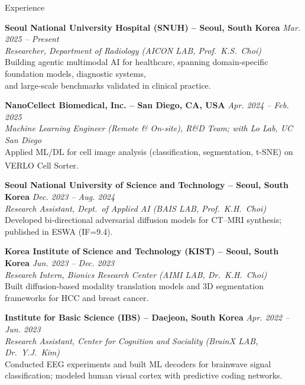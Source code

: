 \documentclass{resume}
\begin{document}
\begin{rSection}{Experience}

\bigskip
\textbf{Seoul National University Hospital (SNUH) -- Seoul, South Korea} \hfill \textit{Mar. 2025 -- Present} \\
\hspace*{0.5em} \textit{Researcher, Department of Radiology (AICON LAB, Prof.\ K.S.\ Choi)} \\
\hspace*{1em} Building agentic multimodal AI for healthcare, spanning domain-specific foundation models, diagnostic systems, \\
\hspace*{1em} and large-scale benchmarks validated in clinical practice.

\bigskip
\textbf{NanoCellect Biomedical, Inc. -- San Diego, CA, USA} \hfill \textit{Apr. 2024 -- Feb. 2025} \\
\hspace*{0.5em} \textit{Machine Learning Engineer (Remote \& On-site), R\&D Team; with Lo Lab, UC San Diego} \\
\hspace*{1em} Applied ML/DL for cell image analysis (classification, segmentation, t-SNE) on VERLO\textsuperscript{\texttrademark} Cell Sorter.

\bigskip
\textbf{Seoul National University of Science and Technology -- Seoul, South Korea} \hfill \textit{Dec. 2023 -- Aug. 2024} \\
\hspace*{0.5em} \textit{Research Assistant, Dept.\ of Applied AI (BAIS LAB, Prof.\ K.H.\ Choi)} \\
\hspace*{1em} Developed bi-directional adversarial diffusion models for CT--MRI synthesis; published in ESWA (IF=9.4).

\bigskip
\textbf{Korea Institute of Science and Technology (KIST) -- Seoul, South Korea} \hfill \textit{Jun. 2023 -- Dec. 2023} \\
\hspace*{0.5em} \textit{Research Intern, Bionics Research Center (AIMI LAB, Dr.\ K.H.\ Choi)} \\
\hspace*{1em} Built diffusion-based modality translation models and 3D segmentation frameworks for HCC and breast cancer.

\bigskip
\textbf{Institute for Basic Science (IBS) -- Daejeon, South Korea} \hfill \textit{Apr. 2022 -- Jun. 2023} \\
\hspace*{0.5em} \textit{Research Assistant, Center for Cognition and Sociality (BrainX LAB, Dr.\ Y.J.\ Kim)} \\
\hspace*{1em} Conducted EEG experiments and built ML decoders for brainwave signal classification; modeled human visual cortex with predictive coding networks.

\end{rSection}
\end{document}
